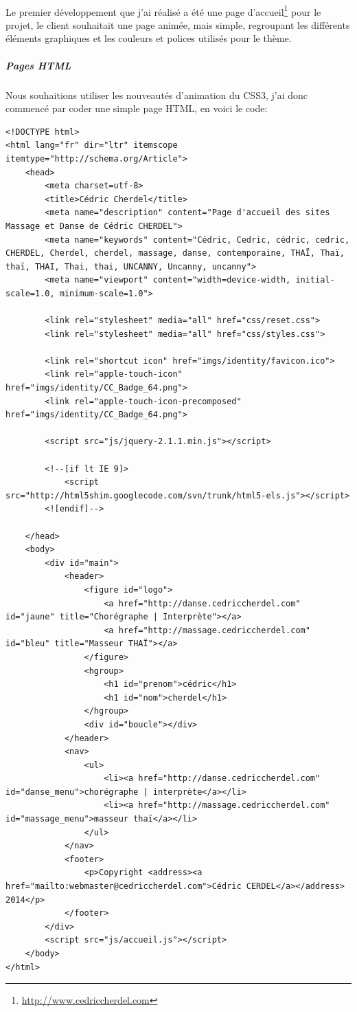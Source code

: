 \documentclass[11pt,a4paper]{report}
\begin{document}
			\paragraph*{}Le premier développement que j'ai réalisé a été une page d'accueil\footnote{\url{http://www.cedriccherdel.com}} pour le projet, le client souhaitait une page animée, mais simple, regroupant les différents éléments graphiques et les couleurs et polices utilisés pour le thème. 
				\subparagraph{Pages HTML}Nous souhaitions utiliser les nouveautés d'animation du CSS3, j'ai donc commencé par coder une simple page HTML, en voici le code:
					\begin{lstlisting}
<!DOCTYPE html>
<html lang="fr" dir="ltr" itemscope itemtype="http://schema.org/Article">
	<head>
		<meta charset=utf-8>
		<title>Cédric Cherdel</title>
        <meta name="description" content="Page d'accueil des sites Massage et Danse de Cédric CHERDEL">
        <meta name="keywords" content="Cédric, Cedric, cédric, cedric, CHERDEL, Cherdel, cherdel, massage, danse, contemporaine, THAÏ, Thaï, thaï, THAI, Thai, thai, UNCANNY, Uncanny, uncanny">
        <meta name="viewport" content="width=device-width, initial-scale=1.0, minimum-scale=1.0">
        
        <link rel="stylesheet" media="all" href="css/reset.css">
        <link rel="stylesheet" media="all" href="css/styles.css">

        <link rel="shortcut icon" href="imgs/identity/favicon.ico">
        <link rel="apple-touch-icon" href="imgs/identity/CC_Badge_64.png">
        <link rel="apple-touch-icon-precomposed" href="imgs/identity/CC_Badge_64.png">

        <script src="js/jquery-2.1.1.min.js"></script>

        <!--[if lt IE 9]>
            <script src="http://html5shim.googlecode.com/svn/trunk/html5-els.js"></script>
        <![endif]-->

    </head>
    <body>
		<div id="main">
	        <header>
				<figure id="logo">
					<a href="http://danse.cedriccherdel.com" id="jaune" title="Chorégraphe | Interprète"></a>
					<a href="http://massage.cedriccherdel.com" id="bleu" title="Masseur THAÏ"></a>
				</figure>
				<hgroup>
					<h1 id="prenom">cédric</h1>
					<h1 id="nom">cherdel</h1>
				</hgroup>
				<div id="boucle"></div>
    	    </header>
        	<nav>
		        <ul>
    		        <li><a href="http://danse.cedriccherdel.com" id="danse_menu">chorégraphe | interprète</a></li>
        	        <li><a href="http://massage.cedriccherdel.com" id="massage_menu">masseur thaï</a></li>
        	    </ul>
        	</nav>
			<footer>
				<p>Copyright <address><a href="mailto:webmaster@cedriccherdel.com">Cédric CERDEL</a></address> 2014</p>
			</footer>
		</div>
		<script src="js/accueil.js"></script>
    </body>
</html>					
					\end{lstlisting}
\end{document}
